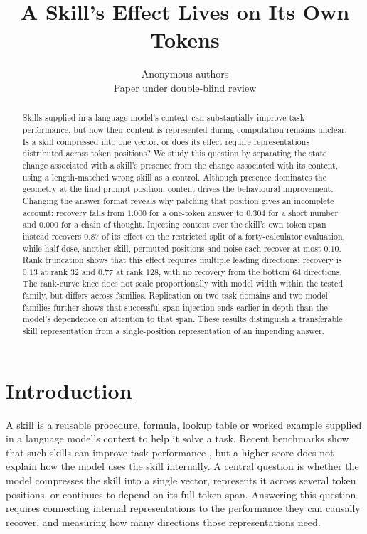 \documentclass{article}
\title{A Skill's Effect Lives on Its Own Tokens}
\author{Anonymous authors \\
Paper under double-blind review}
\begin{document}
\maketitle

\begin{abstract}
Skills supplied in a language model's context can substantially improve task
performance, but how their content is represented during computation remains
unclear. Is a skill compressed into one vector, or does its effect require
representations distributed across token positions? We study this question by
separating the state change associated with a skill's presence from the change
associated with its content, using a length-matched wrong skill as a control.
Although presence dominates the geometry at the final prompt position, content
drives the behavioural improvement. Changing the answer format reveals why
patching that position gives an incomplete account: recovery falls from $1.000$
for a one-token answer to $0.304$ for a short number and $0.000$ for a chain of
thought. Injecting content over the skill's own token span instead recovers
$0.87$ of its effect on the restricted split of a forty-calculator evaluation,
while half dose, another skill, permuted positions and noise each recover at
most $0.10$. Rank truncation shows that this effect requires multiple leading
directions: recovery is $0.13$ at rank $32$ and $0.77$ at rank $128$, with no
recovery from the bottom $64$ directions. The rank-curve knee does not scale
proportionally with model width within the tested family, but differs across
families. Replication on two task domains and two model families further shows
that successful span injection ends earlier in depth than the model's dependence
on attention to that span. These results distinguish a transferable skill
representation from a single-position representation of an impending answer.
\end{abstract}

\section{Introduction}
\label{sec:intro}

A skill is a reusable procedure, formula, lookup table or worked example supplied
in a language model's context to help it solve a task. Recent benchmarks show
that such skills can improve task performance \citep{su2026srabench,
skillsbench2026}, but a higher score does not explain how the model uses the
skill internally. A central question is whether the model compresses the skill
into a single vector, represents it across several token positions, or continues
to depend on its full token span. Answering this question requires connecting
internal representations to the performance they can causally recover, and
measuring how many directions those representations need.
\end{document}
